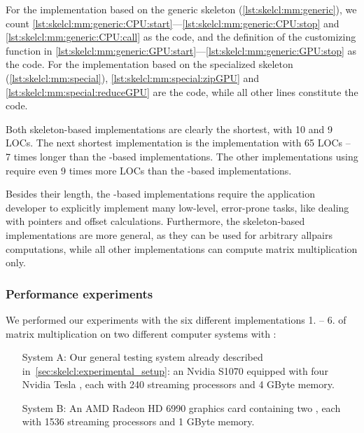 For the implementation based on the generic \allpairs skeleton (\autoref{lst:skelcl:mm:generic}), we count \autoref{lst:skelcl:mm:generic:CPU:start}---\autoref{lst:skelcl:mm:generic:CPU:stop} and \autoref{lst:skelcl:mm:generic:CPU:call} as the \CPU code, and the definition of the customizing function in \autoref{lst:skelcl:mm:generic:GPU:start}---\autoref{lst:skelcl:mm:generic:GPU:stop} as the \GPU code.
For the implementation based on the specialized \allpairs skeleton (\autoref{lst:skelcl:mm:special}), \autoref{lst:skelcl:mm:special:zipGPU} and \autoref{lst:skelcl:mm:special:reduceGPU} are the \GPU code, while all other lines constitute the \CPU code.

Both skeleton-based implementations are clearly the shortest, with 10 and 9 LOCs.
The next shortest implementation is the \CUBLAS implementation with 65 LOCs -- 7 times longer than the \SkelCL-based implementations.
The other implementations using \OpenCL require even 9 times more LOCs than the \SkelCL-based implementations.

Besides their length, the \OpenCL-based implementations require the application developer to explicitly implement many low-level, error-prone tasks, like dealing with pointers and offset calculations.
Furthermore, the skeleton-based implementations are more general, as they can be used for arbitrary allpairs computations, while all other implementations can compute matrix multiplication only.

\FloatBarrier

\subsubsection*{Performance experiments}
We performed our experiments with the six different implementations 1. -- 6. of matrix multiplication on two different computer systems with \GPUs:
\begin{itemize}[leftmargin=50pt]
  \item[System A:] Our general testing system already described in~\autoref{sec:skelcl:experimental_setup}:
    an Nvidia S1070 equipped with four Nvidia Tesla \GPUs, each with 240 streaming processors and 4 GByte memory.
  \item[System B:] An AMD Radeon HD 6990 graphics card containing two \GPUs, each with 1536 streaming processors and 1 GByte memory.
\end{itemize}

